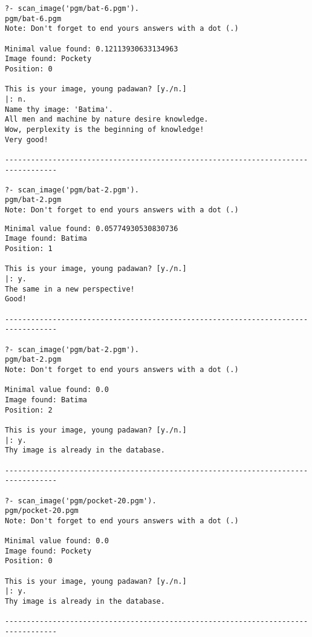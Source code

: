 \documentclass{article}
\begin{document}
        \begin{verbatim}
?- scan_image('pgm/bat-6.pgm').
pgm/bat-6.pgm
Note: Don't forget to end yours answers with a dot (.)

Minimal value found: 0.12113930633134963
Image found: Pockety
Position: 0

This is your image, young padawan? [y./n.]
|: n.
Name thy image: 'Batima'.
All men and machine by nature desire knowledge.
Wow, perplexity is the beginning of knowledge!
Very good!

----------------------------------------------------------------------------------

?- scan_image('pgm/bat-2.pgm').
pgm/bat-2.pgm
Note: Don't forget to end yours answers with a dot (.)
    \end{verbatim}
    
    \newpage
    \begin{verbatim}
Minimal value found: 0.05774930530830736
Image found: Batima
Position: 1

This is your image, young padawan? [y./n.]
|: y.
The same in a new perspective!
Good!

----------------------------------------------------------------------------------

?- scan_image('pgm/bat-2.pgm').
pgm/bat-2.pgm
Note: Don't forget to end yours answers with a dot (.)

Minimal value found: 0.0
Image found: Batima
Position: 2

This is your image, young padawan? [y./n.]
|: y.
Thy image is already in the database.

----------------------------------------------------------------------------------

?- scan_image('pgm/pocket-20.pgm').
pgm/pocket-20.pgm
Note: Don't forget to end yours answers with a dot (.)

Minimal value found: 0.0
Image found: Pockety
Position: 0

This is your image, young padawan? [y./n.]
|: y.
Thy image is already in the database.

----------------------------------------------------------------------------------
        \end{verbatim}
\end{document}
